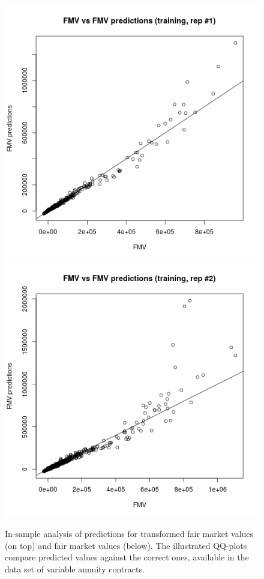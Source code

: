\begin{figure}[h!]
{\includegraphics[scale=0.4]{pictures/boxcox_rep1_fmv_predict_train_median}\includegraphics[scale=0.4]{pictures/boxcox_rep2_fmv_predict_train_median} 
}
\caption{In-sample analysis of predictions for transformed fair market values (on top) and fair market values (below). The illustrated QQ-plots compare predicted values against the correct ones, available in the data set of variable annuity contracts.}\label{predictions_in_sample}
\end{figure}

